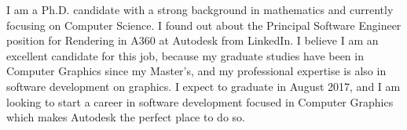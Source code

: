 \documentclass[10pt,stdletter,dateno,sigleft,letterpaper]{newlfm} %
\begin{document}
\begin{newlfm}



I am a Ph.D. candidate with a strong background in mathematics and currently focusing on Computer Science. I found out about the Principal Software Engineer position for Rendering in A360 at Autodesk from LinkedIn. I believe I am an excellent candidate for this job, because my graduate studies have been in Computer Graphics since my Master's, and my professional expertise is also in software development on graphics. I expect to graduate in August 2017, and I am looking to start a career in software development focused in Computer Graphics which makes Autodesk the perfect place to do so.



\end{newlfm}
\end{document}
